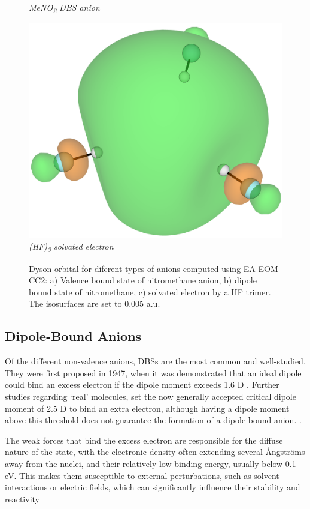 \begin{figure}[h]
\begin{minipage}[b]{0.30\textwidth}
    \small\emph{MeNO\textsubscript{2} DBS anion}
  \end{minipage}
  \hfill
  \begin{minipage}[b]{0.3\textwidth}
    \centering
    \includegraphics[width=1.1\textwidth]{chapters/introduction/image/hf3.png}
    \small\emph{(HF)\textsubscript{3} solvated electron}
  \end{minipage}
  \caption[Valence and Non-Valence Anions]{Dyson orbital for diferent types of anions computed using EA-EOM-CC2: a) Valence bound state of nitromethane anion, b) dipole bound state of nitromethane, c) solvated electron by a HF trimer. The isosurfaces are set to 0.005 a.u.}
  \label{fig:AnionTypes}
\end{figure}

\subsection{Dipole-Bound Anions}
Of the different non-valence anions, DBSs are the most common and well-studied. They were first proposed in 1947, when it was demonstrated that an ideal dipole could bind an excess electron if the dipole moment exceeds 1.6 D \cite{fermi1947capture}. Further studies regarding `real' molecules, set the now generally accepted critical dipole moment of 2.5 D to bind an extra electron, although having a dipole moment above this threshold does not guarantee the formation of a dipole-bound anion. \cite{jordan2003theory}.

The weak forces that bind the excess electron are responsible for the diffuse nature of the state, with the electronic density often extending several \r{A}ngstr{\"o}ms away from the nuclei, and their relatively low binding energy, usually below 0.1 eV. This makes them susceptible to external perturbations, such as solvent interactions or electric fields, which can significantly influence their stability and reactivity \cite{schiedt1998anion,jalbout2001dipole,gutowski2002solvated,jordan2003theory,eustis2007photoelectron,simons2008molecular,herbert2015quantum,clarke2025role}

